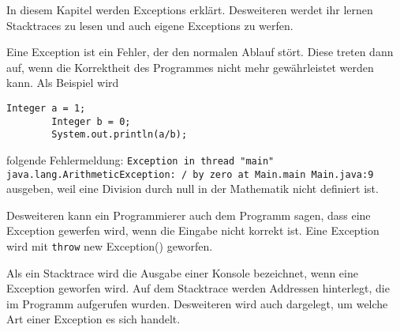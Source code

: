 

In diesem Kapitel werden Exceptions erklärt. Desweiteren werdet ihr lernen Stacktraces zu lesen und auch eigene Exceptions zu werfen. 

\begin{Infobox}[Exception]
    Eine Exception ist ein Fehler, der den normalen Ablauf stört. Diese treten dann auf, wenn die Korrektheit des Programmes nicht mehr gewährleistet werden kann. Als Beispiel wird
    \begin{lstlisting}[breaklines=true, numbers=none]
        Integer a = 1;
        Integer b = 0;
        System.out.println(a/b);
    \end{lstlisting}
    folgende Fehlermeldung: \lstinline{Exception in thread "main" java.lang.ArithmeticException: / by zero at Main.main Main.java:9} ausgeben, weil eine Division durch null in der Mathematik nicht definiert ist.

    Desweiteren kann ein Programmierer auch dem Programm sagen, dass eine Exception gewerfen wird, wenn die Eingabe nicht korrekt ist.
    Eine Exception wird mit \lstinline{throw} new Exception() geworfen. 

\end{Infobox}

\begin{Infobox}[Stacktrace]
    Als ein Stacktrace wird die Ausgabe einer Konsole bezeichnet, wenn eine Exception geworfen wird. 
    Auf dem Stacktrace werden Addressen hinterlegt, die im Programm aufgerufen wurden. Desweiteren wird auch dargelegt, um welche Art einer Exception es sich handelt.
\end{Infobox}

\addexcercise

\addexcercise